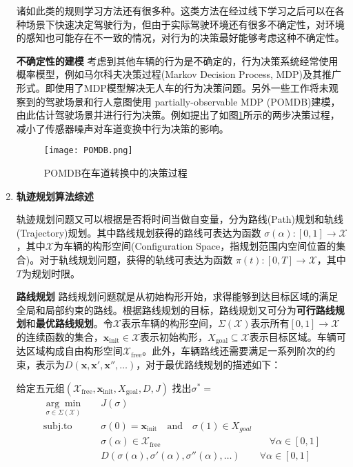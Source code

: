 \begin{enumerate}[wide=\parindent]
诸如此类的规则学习方法还有很多种。这类方法在经过线下学习之后可以在各种场景下快速决定驾驶行为，但由于实际驾驶环境还有很多不确定性，对环境的感知也可能存在不一致的情况，对行为的决策最好能够考虑这种不确定性。

\textbf{不确定性的建模 }
考虑到其他车辆的行为是不确定的，行为决策系统经常使用概率模型，例如马尔科夫决策过程(Markov Decision Process, MDP)及其推广形式。\cite{Brechtel2011Probabilistic}即使用了MDP模型解决无人车的行为决策问题。另外一些工作将未观察到的驾驶场景和行人意图使用 partially-observable MDP (POMDB)建模，由此估计驾驶场景并进行行为决策。例如提出了如图\ref{fig:POMDB}所示的两步决策过程，减小了传感器噪声对车道变换中行为决策的影响。

\begin{figure}[htbp]
\centering
\texttt{[image: POMDB.png]}
\caption[POMDB在车道转换中的决策过程]{POMDB在车道转换中的决策过程\cite{Ulbrich2013Probabilistic}}
\label{fig:POMDB}
\end{figure}

\item \textbf{轨迹规划算法综述}
\label{sec:trajectory}

轨迹规划问题又可以根据是否将时间当做自变量，分为路线(Path)规划和轨线(Trajectory)规划。其中路线规划获得的路线可表达为函数 $\sigma(\alpha): [0,1]\rightarrow \mathcal{X}$，其中$\mathcal{X}$为车辆的构形空间(Configuration Space，指规划范围内空间位置的集合)。对于轨线规划问题，获得的轨线可表达为函数 $\pi(t): [0, T]\rightarrow \mathcal{X}$，其中$T$为规划时限。

\textbf{路线规划 } 路线规划问题就是从初始构形开始，求得能够到达目标区域的满足全局和局部约束的路线。根据路线规划的目标，路线规划又可分为\textbf{可行路线规划}和\textbf{最优路线规划}。令$\mathcal{X}$表示车辆的构形空间，$\Sigma(\mathcal{X})$表示所有$[0,1]\rightarrow \mathcal{X}$的连续函数的集合，$\mathbf{x}_{\mathrm{init}}\in \mathcal{X}$表示初始构形，$X_{\mathrm{goal}}\subseteq \mathcal{X}$表示目标区域。车辆可达区域构成自由构形空间$\mathcal{X}_{\mathrm{free}}$。此外，车辆路线还需要满足一系列阶次的约束，表示为$D(\mathbf{x},\mathbf{x}',\mathbf{x}'', \dots)$，对于最优路线规划的描述如下：

\begin{definition}[最优路线规划]
\label{def:path}
给定五元组$(\mathcal{X}_{\mathrm{free}}, \mathbf{x}_{\mathrm{init}}, X_{\mathrm{goal}}, D, J)$ 找出$\sigma^*=$
\begin{equation}
\begin{aligned}
\underset{\sigma\in \Sigma(\mathcal{X})}{\arg\min}\quad & J(\sigma) & \\
\mathrm{subj. to} \quad & \sigma(0)=\mathbf{x}_{\mathrm{init}} \quad \mathrm{and} \quad \sigma(1)\in X_{goal} & \\
\quad & \sigma(\alpha)\in \mathcal{X}_{\mathrm{free}} & \quad \forall \alpha\in [0,1]\\
& D(\sigma(\alpha),\sigma'(\alpha),\sigma''(\alpha), \dots) & \forall \alpha\in [0,1]
\end{aligned}
\end{equation}
\end{definition}


\end{enumerate}
